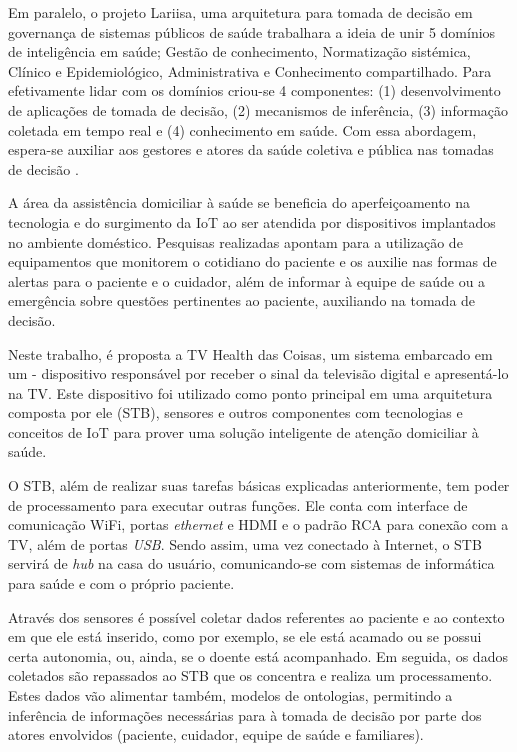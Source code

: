 Em paralelo, o projeto Lariisa, uma arquitetura para tomada de decisão em governança
de sistemas públicos de saúde trabalhara a ideia de unir 5 domínios de inteligência
em saúde; Gestão de conhecimento, Normatização sistémica, Clínico e Epidemiológico,
Administrativa e Conhecimento compartilhado. Para efetivamente lidar com os domínios
criou-se 4 componentes: (1) desenvolvimento de aplicações de tomada de decisão, (2) 
mecanismos de inferência, (3) informação coletada em tempo real e (4) conhecimento em 
saúde. Com essa abordagem, espera-se auxiliar aos gestores e atores da saúde coletiva 
e pública nas tomadas de decisão \cite{oliveira2010context}.

A área da assistência domiciliar à saúde se beneficia do aperfeiçoamento na
tecnologia e do surgimento da IoT ao ser atendida por dispositivos implantados
no ambiente doméstico.  Pesquisas realizadas \cite{triantafyllidis2013,moreira2016} 
apontam para a utilização de equipamentos que monitorem o cotidiano do paciente
e os auxilie nas formas de alertas para o paciente e o cuidador, além de
informar à equipe de saúde ou a emergência sobre questões pertinentes ao
paciente, auxiliando na tomada de decisão.

Neste trabalho, é proposta a TV Health das Coisas, um sistema embarcado em um
\stb[] - dispositivo responsável por receber o sinal da  televisão digital e
apresentá-lo na TV. Este dispositivo foi utilizado como ponto principal em uma
arquitetura composta por ele (STB), sensores e outros componentes com
tecnologias e conceitos de IoT para  prover uma solução inteligente de atenção
domiciliar à saúde.

O STB, além de realizar suas tarefas básicas explicadas anteriormente, tem poder
de processamento para executar outras funções. Ele conta com interface de
comunicação WiFi, portas \textit{ethernet} e HDMI e o padrão RCA para
conexão com a TV, além de portas \textit{USB}. Sendo assim, uma vez conectado à
Internet, o STB servirá de \textit{hub} na casa do usuário, comunicando-se
com sistemas de informática para saúde e com o próprio paciente.

Através dos sensores é possível coletar dados referentes ao paciente e ao
contexto em que ele está inserido, como por exemplo, se ele está acamado ou se
possui certa autonomia, ou, ainda, se o doente está acompanhado.  Em seguida, os
dados coletados são repassados ao STB que  os concentra e realiza um
processamento. Estes dados vão alimentar também, modelos de ontologias, 
permitindo a inferência de informações necessárias para à tomada de decisão
por parte dos atores  envolvidos (paciente, cuidador, equipe de saúde e 
familiares). 

